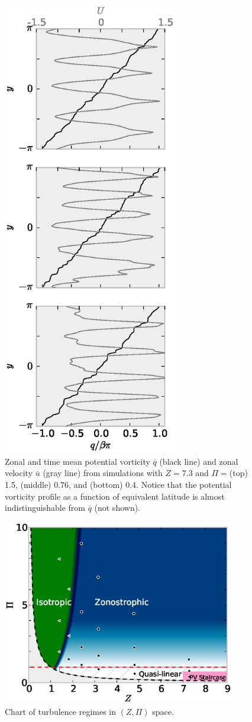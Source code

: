 \documentclass{jfm}
\begin{document}
\begin{figure}
\begin{center}
\includegraphics[width=3in]{PV_vs_y}
\caption{Zonal and time mean potential vorticity $\overline{q}$ (black line)
and zonal velocity $\overline{u}$ (gray line) from simulations with
$Z=7.3$ and $\Pi=$(top) 1.5, (middle) 0.76, and (bottom) 0.4. Notice that the
potential vorticity profile as a function of equivalent latitude is almost indistinguishable
from $\overline{q}$ (not shown).}
\label{PV_vs_y_drag1e-4}
\end{center}
\end{figure}

\begin{figure}
\begin{center}
\includegraphics[width=4in]{regime_illustration}\caption{Chart of turbulence regimes in $(Z,\Pi)$ space.}
\label{regime_illustration}
\end{center}
\end{figure}
\end{document}
